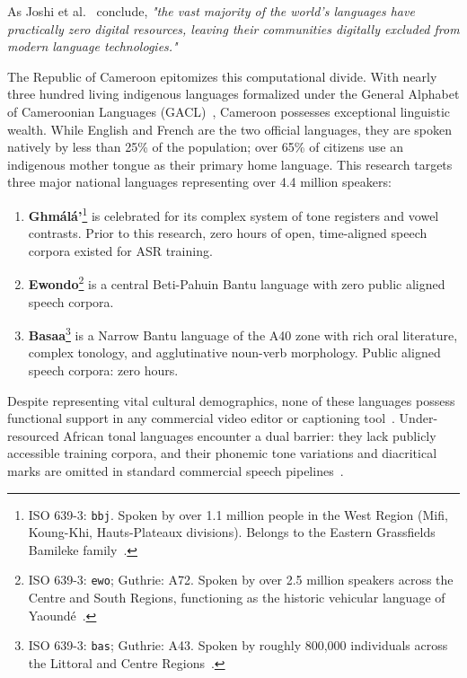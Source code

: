 \documentclass[conference]{IEEEtran}
\begin{document}
As Joshi et al.~\cite{nekoto2020participatory} conclude, \textit{"the vast majority of the world's languages have practically zero digital resources, leaving their communities digitally excluded from modern language technologies."}

The Republic of Cameroon epitomizes this computational divide. With nearly three hundred living indigenous languages formalized under the General Alphabet of Cameroonian Languages (GACL)~\cite{tadadjeu1979alphabet}, Cameroon possesses exceptional linguistic wealth. While English and French are the two official languages, they are spoken natively by less than 25\% of the population; over 65\% of citizens use an indigenous mother tongue as their primary home language. This research targets three major national languages representing over 4.4 million speakers:
\begin{enumerate}
    \item \textbf{Gh\textopeno m\'al\'a'}\footnote{ISO 639-3: \texttt{bbj}. Spoken by over 1.1 million people in the West Region (Mifi, Koung-Khi, Hauts-Plateaux divisions). Belongs to the Eastern Grassfields Bamileke family~\cite{tadadjeu1979alphabet}.} is celebrated for its complex system of tone registers and vowel contrasts. Prior to this research, zero hours of open, time-aligned speech corpora existed for ASR training.
    \item \textbf{Ewondo}\footnote{ISO 639-3: \texttt{ewo}; Guthrie: A72. Spoken by over 2.5 million speakers across the Centre and South Regions, functioning as the historic vehicular language of Yaound\'e~\cite{tadadjeu1979alphabet}.} is a central Beti-Pahuin Bantu language with zero public aligned speech corpora.
    \item \textbf{Basaa}\footnote{ISO 639-3: \texttt{bas}; Guthrie: A43. Spoken by roughly 800,000 individuals across the Littoral and Centre Regions~\cite{tadadjeu1979alphabet}.} is a Narrow Bantu language of the A40 zone with rich oral literature, complex tonology, and agglutinative noun-verb morphology. Public aligned speech corpora: zero hours.
\end{enumerate}

Despite representing vital cultural demographics, none of these languages possess functional support in any commercial video editor or captioning tool~\cite{conneau2023fleurs}. Under-resourced African tonal languages encounter a dual barrier: they lack publicly accessible training corpora, and their phonemic tone variations and diacritical marks are omitted in standard commercial speech pipelines~\cite{conneau2023fleurs, nekoto2020participatory}.
\end{document}

